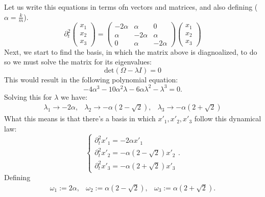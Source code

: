 \documentclass[10pt,twocoloumn]{article}
\begin{document}
Let us write this equations in terms ofn vectors and matrices, and also defining  ($\alpha = \frac k m$).
\begin{equation}
    \partial^2_t \begin{pmatrix} x_1 \\ x_2 \\ x_3 \end{pmatrix} = \begin{pmatrix} -2\alpha & \alpha & 0 \\ \alpha & -2 \alpha & \alpha \\ 0 & \alpha & -2\alpha \end{pmatrix} \begin{pmatrix} x_1  \\ x_2 \\ x_3 \end{pmatrix}
\end{equation}
Next, we start to find the basis, in which the matrix above is diagnoalized, to do so we must solve the matrix for its eigenvalues:
\begin{equation}
    \text{det}(\Omega - \lambda I) = 0
\end{equation}
This would result in the following polynomial equation:
\begin{equation}
    -4\alpha^3 - 10\alpha^2\lambda -6\alpha\lambda^2 - \lambda^3 = 0.
\end{equation}
Solving this for $\lambda$ we have:
\begin{equation}
    \begin{matrix}
        \lambda_1 \rightarrow -2\alpha, & \lambda_2\rightarrow -\alpha (2 - \sqrt 2), &\lambda_3 \rightarrow -\alpha(2+\sqrt 2)
    \end{matrix}
\end{equation}
What this means is that there's a basis in which $x'_1,x'_2,x'_3$ follow this dynamical law:
\begin{equation}
    \begin{cases}
        \partial_t^2 x'_1 = -2\alpha x'_1 \\
        \partial_t^2 x'_2 = -\alpha (2-\sqrt 2) x'_2\\
        \partial_t^2 x'_3 = -\alpha (2 + \sqrt 2)x'_3
    \end{cases}
    .
\end{equation}
Defining
\begin{equation}
    \begin{matrix}
        \omega_1 := 2\alpha, & \omega_2  := \alpha(2-\sqrt2), & \omega_3 :=\alpha(2 + \sqrt2).
    \end{matrix}
\end{equation}
\end{document}
